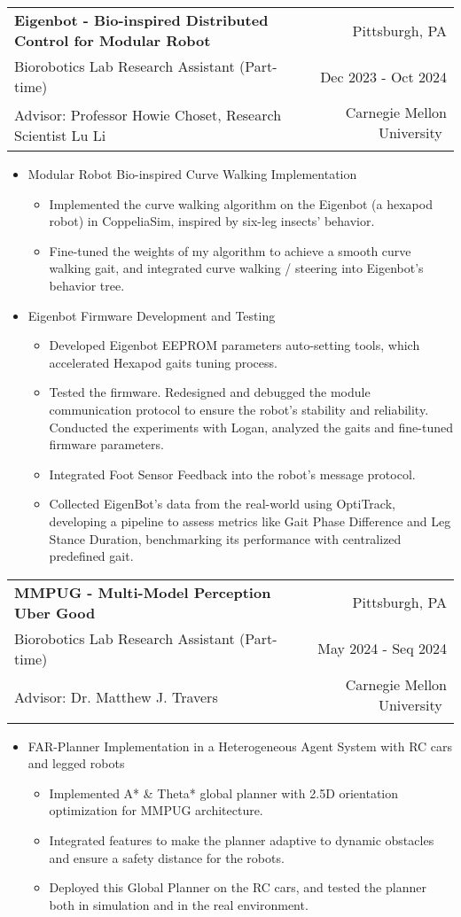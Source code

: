 \documentclass[a4paper,20pt]{article}
\makeatletter
\newcommand{\resumeResearchSubheading}[7]{
  \vspace{5pt}\item
    \begin{tabular*} {0.98\textwidth} {@{\hspace{-0.5em}}l@{\extracolsep{\fill}}r@{}}
      \textbf{#1} & {#2}\null \\
      {#3} & {#4} \\
      {#5} & {#6} \vspace*{4pt}
      {#7}
    \end{tabular*}
  \vspace{-6pt}
}
\newcommand{\resumeResearchItemListStart}{
  \begin{itemize} [leftmargin=*]
}
\newcommand{\resumeResearchItemListEnd}{
  \end{itemize}
  \vspace{-5pt}
}
\newcommand{\resumeResearchItem}[1]{
  \item{
    {#1 \vspace{-1pt}}
  }
}
\newcommand{\resumeResearchMidItemListStart}{
  \begin{itemize} [leftmargin=*]
}
\newcommand{\resumeResearchMidItemListEnd}{
  \end{itemize}
  \vspace{-5pt}
}
\newcommand{\resumeResearchMidItem}[2]{
  \item{
    \textbf{#1}
    {#2 \vspace{-2pt}}
  }
}
\makeatother
\begin{document}
\resumeResearchSubheading
{Eigenbot - Bio-inspired Distributed Control for Modular Robot} {Pittsburgh, PA}
{Biorobotics Lab Research Assistant (Part-time)} {Dec 2023 - Oct 2024}
{Advisor: Professor Howie Choset, Research Scientist Lu Li} {Carnegie Mellon University}
\resumeResearchMidItemListStart
\resumeResearchMidItem{}
{Modular Robot Bio-inspired Curve Walking Implementation}
{
  \resumeResearchItemListStart
  \resumeResearchItem{}
  {Implemented the curve walking algorithm on the Eigenbot (a hexapod robot) in CoppeliaSim, inspired by six-leg insects' behavior. }
  \resumeResearchItem{}
  {Fine-tuned the weights of my algorithm to achieve a smooth curve walking gait, and integrated curve walking / steering into Eigenbot's behavior tree.}
  \resumeResearchItemListEnd
}
\resumeResearchMidItem{}
{Eigenbot Firmware Development and Testing}
{
  \resumeResearchItemListStart
  \resumeResearchItem{}
  {Developed Eigenbot EEPROM parameters auto-setting tools, which accelerated Hexapod gaits tuning process.}
  \resumeResearchItem{}
  {Tested the firmware. Redesigned and debugged the module communication protocol to ensure the robot's stability and reliability. Conducted the experiments with Logan, analyzed the gaits and fine-tuned firmware parameters.}
  \resumeResearchItem{}
  {Integrated Foot Sensor Feedback into the robot's message protocol.}
  \resumeResearchItem{}
  {Collected EigenBot's data from the real-world using OptiTrack, developing a pipeline to assess metrics like Gait Phase Difference and Leg Stance Duration, benchmarking its performance with centralized predefined gait.}
  \resumeResearchItemListEnd
}
\resumeResearchMidItemListEnd

\resumeResearchSubheading
{MMPUG - Multi-Model Perception Uber Good} {Pittsburgh, PA}
{Biorobotics Lab Research Assistant (Part-time)} {May 2024 - Seq 2024}
{Advisor: Dr. Matthew J. Travers} {Carnegie Mellon University}
\resumeResearchMidItemListStart
\resumeResearchMidItem{}
{FAR-Planner Implementation in a Heterogeneous Agent System with RC cars and legged robots}
{
  \resumeResearchItemListStart
  \resumeResearchItem{}
  {Implemented A* \& Theta* global planner with 2.5D orientation optimization for MMPUG architecture.}
  \resumeResearchItem{}
  {Integrated features to make the planner adaptive to dynamic obstacles and ensure a safety distance for the robots.}
  \resumeResearchItem{}
  {Deployed this Global Planner on the RC cars, and tested the planner both in simulation and in the real environment.}
  \resumeResearchItemListEnd
}
\resumeResearchMidItemListEnd
\end{document}
